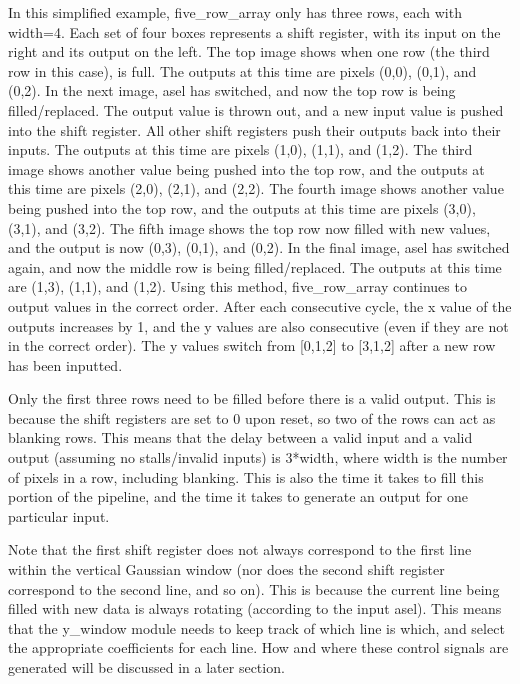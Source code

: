 In this simplified example, five\_row\_array only has three rows, each with width=4. Each set of four boxes represents a shift register, with its input on the right and its output on the left. The top image shows when one row (the third row in this case), is full. The outputs at this time are pixels (0,0), (0,1), and (0,2). In the next image, asel has switched, and now the top row is being filled/replaced. The output value is thrown out, and a new input value is pushed into the shift register. All other shift registers push their outputs back into their inputs. The outputs at this time are pixels (1,0), (1,1), and (1,2). The third image shows another value being pushed into the top row, and the outputs at this time are pixels (2,0), (2,1), and (2,2). The fourth image shows another value being pushed into the top row, and the outputs at this time are pixels (3,0), (3,1), and (3,2). The fifth image shows the top row now filled with new values, and the output is now (0,3), (0,1), and (0,2). In the final image, asel has switched again, and now the middle row is being filled/replaced. The outputs at this time are (1,3), (1,1), and (1,2). Using this method, five\_row\_array continues to output values in the correct order. After each consecutive cycle, the x value of the outputs increases by 1, and the y values are also consecutive (even if they are not in the correct order). The y values switch from [0,1,2] to [3,1,2] after a new row has been inputted.

Only the first three rows need to be filled before there is a valid output. This 
is because the shift registers are set to 0 upon reset, so two of the rows can 
act as blanking rows. This means that the delay between a valid input and 
a valid output (assuming no stalls/invalid inputs) is 3*width, where width is 
the number of pixels in a row, including blanking. This is also the time it 
takes to fill this portion of the pipeline, and the time it takes to generate an 
output for one particular input.

Note that the first shift register does not always correspond to the first line 
within the vertical Gaussian window (nor does the second shift register 
correspond to the second line, and so on). This is because the current line 
being filled with new data is always rotating (according to the input asel). 
This means that the y\_window module needs to keep track of which line is which, 
and select the appropriate coefficients for each line. How and where these 
control signals are generated will be discussed in a later section.


